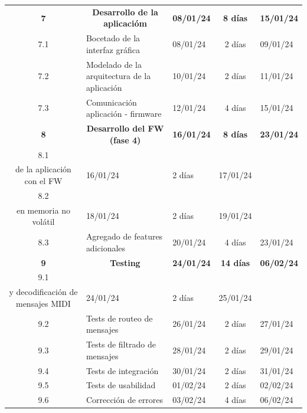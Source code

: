 \documentclass[
11pt, %
]{charter}
\begin{document}
\begin{longtable}[c]{|cllcl|}
	\rowcolor[HTML]{ECF4FF} 
	\textbf{7} & \multicolumn{1}{c}{\cellcolor[HTML]{ECF4FF}\textbf{Desarrollo de la aplicacióm}} & \textbf{08/01/24} & \textbf{8 días} & \textbf{15/01/24} \\
	7.1 & Bocetado de la interfaz gráfica & 08/01/24 & 2 días & 09/01/24 \\
	\rowcolor[HTML]{EFEFEF} 
	7.2 & Modelado de la arquitectura de la aplicación & 10/01/24 & 2 días & 11/01/24 \\
	7.3 & Comunicación aplicación - firmware & 12/01/24 & 4 días & 15/01/24 \\
	\rowcolor[HTML]{ECF4FF} 
	\textbf{8} & \multicolumn{1}{c}{\cellcolor[HTML]{ECF4FF}\textbf{Desarrollo del FW (fase 4)}} & \textbf{16/01/24} & \textbf{8 días} & \textbf{23/01/24} \\
	8.1 & \begin{tabular}[c]{@{}l@{}}Integración entre configuración \\ de la aplicación con el FW\end{tabular} & 16/01/24 & 2 días & 17/01/24 \\
	\rowcolor[HTML]{EFEFEF} 
	8.2 & \begin{tabular}[c]{@{}l@{}}Almacenamiento de configuraciones\\ en memoria no volátil\end{tabular} & 18/01/24 & 2 días & 19/01/24 \\
	8.3 & Agregado de features adicionales & 20/01/24 & 4 días & 23/01/24 \\
	\rowcolor[HTML]{ECF4FF} 
	\textbf{9} & \multicolumn{1}{c}{\cellcolor[HTML]{ECF4FF}\textbf{Testing}} & \textbf{24/01/24} & \textbf{14 días} & \textbf{06/02/24} \\
	9.1 & \begin{tabular}[c]{@{}l@{}}Tests unitarios para codificación\\ y decodificación de mensajes MIDI\end{tabular} & 24/01/24 & 2 días & 25/01/24 \\
	\rowcolor[HTML]{EFEFEF} 
	9.2 & Tests de routeo de mensajes & 26/01/24 & 2 días & 27/01/24 \\
	9.3 & Tests de filtrado de mensajes & 28/01/24 & 2 días & 29/01/24 \\
	\rowcolor[HTML]{EFEFEF} 
	9.4 & Tests de integración & 30/01/24 & 2 días & 31/01/24 \\
	9.5 & Tests de usabilidad & 01/02/24 & 2 días & 02/02/24 \\
	\rowcolor[HTML]{EFEFEF} 
	9.6 & Corrección de errores & 03/02/24 & 4 días & 06/02/24 \\

\end{longtable}
\end{document}
